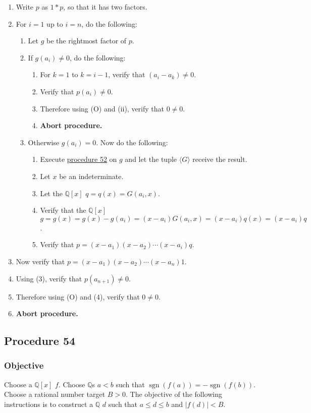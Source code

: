 \documentclass[twocolumn]{article}
\DeclareMathOperator{\sgn}{sgn}
\newcommand{\procedure}[2][]{\subsection*{Procedure #2 \ifthenelse{\equal{#1}{}}{}{(#1)}}\label{sec:procedure #2}}
\newcommand{\objective}{\subsubsection*{Objective}}
\begin{document}
				\begin{enumerate}
					\item Write $p$ as $1*p$, so that it has two factors.
					\item For $i=1$ up to $i=n$, do the following:
					\begin{enumerate}
						\item Let $g$ be the rightmost factor of $p$.
						\item If $g(a_i)\ne 0$, do the following:
						\begin{enumerate}
							\item For $k=1$ to $k=i-1$, verify that $(a_i-a_k)\ne 0$.
							\item Verify that $p(a_i)\ne 0$.
							\item Therefore using (O) and (ii), verify that $0\ne 0$.
							\item \textbf{Abort procedure.}
						\end{enumerate}
						\item Otherwise $g(a_i)=0$. Now do the following:
						\begin{enumerate}
							\item Execute \hyperref[sec:procedure 52]{procedure 52} on $g$ and let the tuple $\langle G\rangle$ receive the result.
							\item Let $x$ be an indeterminate.
							\item Let the $\mathbb{Q}[x]$ $q=q(x)=G(a_i,x)$.
							\item Verify that the $\mathbb{Q}[x]$ $g=g(x)=g(x)-g(a_i)=(x-a_i)G(a_i,x)=(x-a_i)q(x)=(x-a_i)q$.
							\item Verify that $p=(x-a_1)(x-a_2)\cdots(x-a_i)q$.
						\end{enumerate}
					\end{enumerate}
					\item Now verify that $p=(x-a_1)(x-a_2)\cdots(x-a_n)1$.
					\item Using (3), verify that $p(a_{n+1})\ne 0$.
					\item Therefore using (O) and (4), verify that $0\ne 0$.
					\item \textbf{Abort procedure.}
				\end{enumerate}
		\procedure[Bisection]{54}
			\objective
				Choose a $\mathbb{Q}[x]$ $f$. Choose $\mathbb{Q}$s $a<b$ such that $\sgn(f(a))=-\sgn(f(b))$. Choose a rational number target $B>0$. The objective of the following instructions is to construct a $\mathbb{Q}$ $d$ such that $a\le d\le b$ and $\lvert f(d)\rvert<B$.
\end{document}
